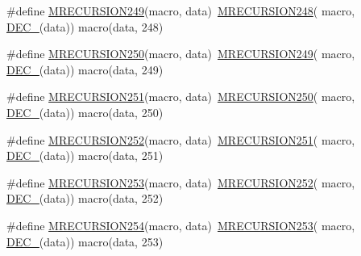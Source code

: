 \begin{DoxyCompactItemize}
\item 
\#define \mbox{\hyperlink{group__group__sam0__utils__mrecursion_ga88378c5ef3f59f0a70241fe6f4c35673}{M\+R\+E\+C\+U\+R\+S\+I\+O\+N249}}(macro,  data)~\mbox{\hyperlink{group__group__sam0__utils__mrecursion_ga769f51d1e1ee63f851004b0b7754e9c1}{M\+R\+E\+C\+U\+R\+S\+I\+O\+N248}}(  macro, \mbox{\hyperlink{group__group__sam0__utils__mrecursion_ga1d23d683797679dca8c3512a54a5dcae}{D\+E\+C\+\_\+}}(data))   macro(data, 248)
\item 
\#define \mbox{\hyperlink{group__group__sam0__utils__mrecursion_gabf6d964d9a876f23c5d7269c10bb4d08}{M\+R\+E\+C\+U\+R\+S\+I\+O\+N250}}(macro,  data)~\mbox{\hyperlink{group__group__sam0__utils__mrecursion_ga88378c5ef3f59f0a70241fe6f4c35673}{M\+R\+E\+C\+U\+R\+S\+I\+O\+N249}}(  macro, \mbox{\hyperlink{group__group__sam0__utils__mrecursion_ga1d23d683797679dca8c3512a54a5dcae}{D\+E\+C\+\_\+}}(data))   macro(data, 249)
\item 
\#define \mbox{\hyperlink{group__group__sam0__utils__mrecursion_ga41dbf786afa14bfc12394ead27564bea}{M\+R\+E\+C\+U\+R\+S\+I\+O\+N251}}(macro,  data)~\mbox{\hyperlink{group__group__sam0__utils__mrecursion_gabf6d964d9a876f23c5d7269c10bb4d08}{M\+R\+E\+C\+U\+R\+S\+I\+O\+N250}}(  macro, \mbox{\hyperlink{group__group__sam0__utils__mrecursion_ga1d23d683797679dca8c3512a54a5dcae}{D\+E\+C\+\_\+}}(data))   macro(data, 250)
\item 
\#define \mbox{\hyperlink{group__group__sam0__utils__mrecursion_ga6ed69ac45fac97d823737b0b9eb1f0b9}{M\+R\+E\+C\+U\+R\+S\+I\+O\+N252}}(macro,  data)~\mbox{\hyperlink{group__group__sam0__utils__mrecursion_ga41dbf786afa14bfc12394ead27564bea}{M\+R\+E\+C\+U\+R\+S\+I\+O\+N251}}(  macro, \mbox{\hyperlink{group__group__sam0__utils__mrecursion_ga1d23d683797679dca8c3512a54a5dcae}{D\+E\+C\+\_\+}}(data))   macro(data, 251)
\item 
\#define \mbox{\hyperlink{group__group__sam0__utils__mrecursion_ga996e4e7d2feb306157f1bfec60e6b038}{M\+R\+E\+C\+U\+R\+S\+I\+O\+N253}}(macro,  data)~\mbox{\hyperlink{group__group__sam0__utils__mrecursion_ga6ed69ac45fac97d823737b0b9eb1f0b9}{M\+R\+E\+C\+U\+R\+S\+I\+O\+N252}}(  macro, \mbox{\hyperlink{group__group__sam0__utils__mrecursion_ga1d23d683797679dca8c3512a54a5dcae}{D\+E\+C\+\_\+}}(data))   macro(data, 252)
\item 
\#define \mbox{\hyperlink{group__group__sam0__utils__mrecursion_gaa9e7658b8125d6cb42ca97f8c227d903}{M\+R\+E\+C\+U\+R\+S\+I\+O\+N254}}(macro,  data)~\mbox{\hyperlink{group__group__sam0__utils__mrecursion_ga996e4e7d2feb306157f1bfec60e6b038}{M\+R\+E\+C\+U\+R\+S\+I\+O\+N253}}(  macro, \mbox{\hyperlink{group__group__sam0__utils__mrecursion_ga1d23d683797679dca8c3512a54a5dcae}{D\+E\+C\+\_\+}}(data))   macro(data, 253)

\end{DoxyCompactItemize}

